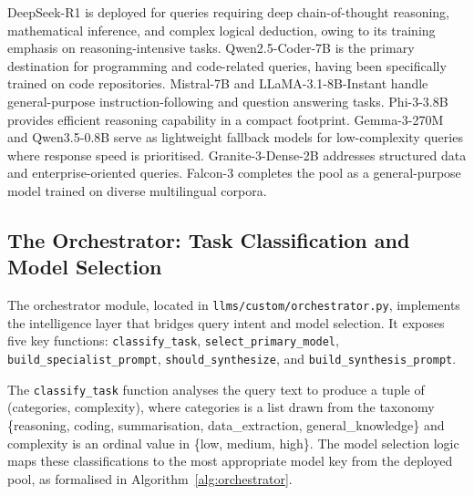 \documentclass[12pt,a4paper]{article}
\begin{document}
DeepSeek-R1 is deployed for queries requiring deep chain-of-thought reasoning, mathematical inference, and complex logical deduction, owing to its training emphasis on reasoning-intensive tasks. Qwen2.5-Coder-7B is the primary destination for programming and code-related queries, having been specifically trained on code repositories. Mistral-7B and LLaMA-3.1-8B-Instant handle general-purpose instruction-following and question answering tasks. Phi-3-3.8B provides efficient reasoning capability in a compact footprint. Gemma-3-270M and Qwen3.5-0.8B serve as lightweight fallback models for low-complexity queries where response speed is prioritised. Granite-3-Dense-2B addresses structured data and enterprise-oriented queries. Falcon-3 completes the pool as a general-purpose model trained on diverse multilingual corpora.


\subsection{The Orchestrator: Task Classification and Model Selection}
\label{subsec:orchestrator}

The orchestrator module, located in \texttt{llms/custom/orchestrator.py}, implements the intelligence layer that bridges query intent and model selection. It exposes five key functions: \texttt{classify\_task}, \texttt{select\_primary\_model}, \texttt{build\_specialist\_prompt}, \texttt{should\_synthesize}, and \texttt{build\_synthesis\_prompt}.

The \texttt{classify\_task} function analyses the query text to produce a tuple of (categories, complexity), where categories is a list drawn from the taxonomy \{reasoning, coding, summarisation, data\_extraction, general\_knowledge\} and complexity is an ordinal value in \{low, medium, high\}. The model selection logic maps these classifications to the most appropriate model key from the deployed pool, as formalised in Algorithm~\ref{alg:orchestrator}.
\end{document}

